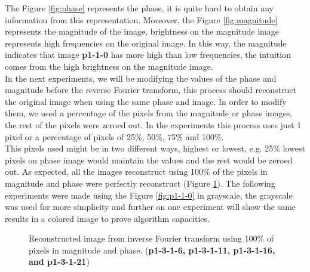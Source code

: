 \documentclass[12pt,a4paper]{article}
\begin{document}
The Figure \ref{fig:phase} represents the phase, it is quite hard to obtain any information from this representation. Moreover, the Figure \ref{fig:magnitude} represents the magnitude of the image, brightness on the magnitude image represents high frequencies on the original image. In this way, the magnitude indicates that image \textbf{p1-1-0} has more high than low frequencies, the intuition comes from the high brightness on the magnitude image. \\

In the next experiments, we will be modifying the values of the phase and magnitude before the reverse Fourier transform, this process should reconstruct the original image when using the same phase and image. In order to modify them, we used a percentage of the pixels from the magnitude or phase images, the rest of the pixels were zeroed out. In the experiments this process uses just 1 pixel or a percentage of pixels of 25\%, 50\%, 75\% and 100\%. \\

This pixels used might be in two different ways, highest or lowest, e.g. 25\% lowest pixels on phase image would maintain the values and the rest would be zeroed out. As expected, all the images reconstruct using 100\% of the pixels in magnitude and phase were perfectly reconstruct (Figure \ref{fig:inverse}). The following experiments were made using the Figure \ref{fig:p1-1-0} in grayscale, the grayscale was used for more simplicity and further on one experiment will show the same results in a colored image to prove algorithm capacities. \\


\begin{figure}[!h]
	\centering
	{%
		\setlength{\fboxsep}{1pt}%
		\setlength{\fboxrule}{1pt}%
	}%
	\caption{Reconstructed image from inverse Fourier transform using 100\% of pixels in magnitude and phase. (\textbf{p1-3-1-6, p1-3-1-11, p1-3-1-16, and p1-3-1-21})}
	\label{fig:inverse}
\end{figure}
\end{document}
